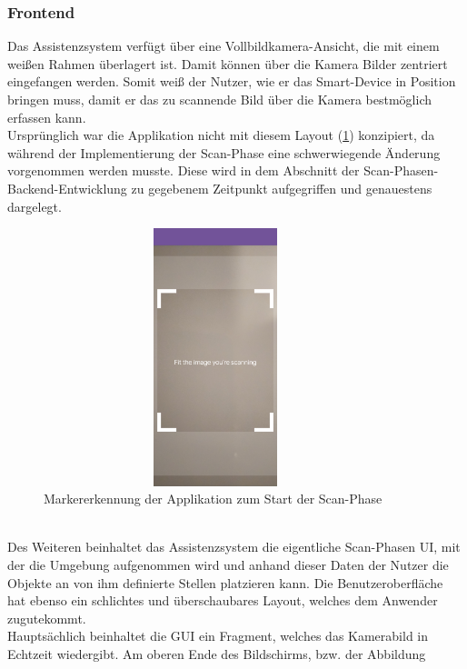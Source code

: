 \subsubsection{Frontend}
Das Assistenzsystem verfügt über eine Vollbildkamera-Ansicht, die mit einem weißen Rahmen überlagert ist. Damit können über die Kamera Bilder zentriert 
eingefangen werden. Somit weiß der Nutzer, wie er das Smart-Device in Position bringen muss, damit er das zu scannende Bild über die Kamera 
bestmöglich erfassen kann. 
\\ 
\linebreak
Ursprünglich war die Applikation nicht mit diesem Layout (\ref{pic:image_tracking}) konzipiert, da während der Implementierung der Scan-Phase eine 
schwerwiegende Änderung vorgenommen werden musste. Diese wird in dem Abschnitt der Scan-Phasen-Backend-Entwicklung zu gegebenem Zeitpunkt 
aufgegriffen und genauestens dargelegt. 
\begin{figure}[hbt!]
    \centering
    \includegraphics[width=10cm,height=7.5cm,keepaspectratio]{4Umsetzung/Bilder/image_tracking.jpg}
    \caption{Markererkennung der Applikation zum Start der Scan-Phase}
    \label{pic:image_tracking}
\end{figure}
\pagebreak 
\\
\linebreak 
Des Weiteren beinhaltet das Assistenzsystem die eigentliche Scan-Phasen \acs{UI}, mit der die Umgebung aufgenommen wird und anhand dieser Daten 
der Nutzer die Objekte an von ihm definierte Stellen platzieren kann. Die Benutzeroberfläche hat ebenso ein schlichtes und überschaubares Layout, 
welches dem Anwender zugutekommt. 
\\ 
Hauptsächlich beinhaltet die \acs{GUI} ein Fragment, welches das Kamerabild in Echtzeit wiedergibt. Am oberen Ende des Bildschirms, bzw. der Abbildung 
